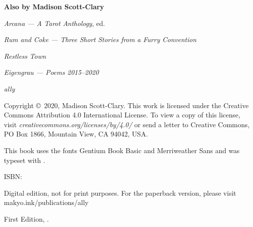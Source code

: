 
\thispagestyle{empty}
\null
\vfill
\begin{center}
    \noindent\textbf{Also by Madison Scott-Clary}

    \emph{Arcana --- A Tarot Anthology}, ed.

    \emph{Rum and Coke --- Three Short Stories from a Furry Convention}

    \emph{Restless Town}

    \emph{Eigengrau --- Poems 2015--2020}

    \emph{ally}
\end{center}
\vfill
\singlespacing
{\small\parindent0pt\parskip5pt
\noindent Copyright \copyright\ 2020, Madison Scott-Clary. This work is licensed under the Creative Commons Attribution 4.0 International License. To view a copy of this license, visit \mbox{\emph{creativecommons.org/licenses/by/4.0/}} or send a letter to Creative Commons, PO Box 1866, Mountain View, CA 94042, USA.

This book uses the fonts Gentium Book Basic and  {\allyFont Merriweather Sans} and was typeset with {\XeLaTeX}.

\vspace{1ex}

ISBN: \ISBN

Digital edition, not for print purposes. For the paperback version, please visit makyo.ink/publications/ally

\vspace{1ex}

\emph{\Title}

\vspace{1ex}

First Edition, \Year.

\EditionsList
}

\cleardoublepage

